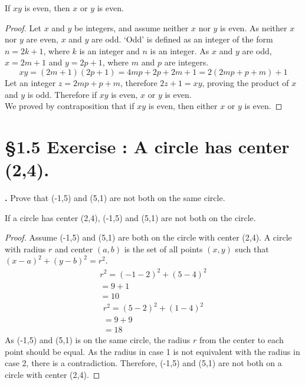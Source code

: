 \documentclass[a4paper,11pt]{article}
\begin{document}
\begin{theorem6}
If \(xy\) is even, then \(x\) or \(y\) is even.
\begin{proof}
Let \(x\) and \(y\) be integers, and assume neither \(x\) nor \(y\) is even.
As neither \(x\) nor \(y\) are even, \(x\) and \(y\) are odd.
`Odd' is defined as an integer of the form \(n = 2k+1\), where \(k\) is an 
integer and \(n\) is an integer.
As \(x\) and \(y\) are odd, \(x=2m+1\) and \(y=2p+1\), where \(m\) and \(p\) are 
integers.
\begin{equation*}
xy=(2m+1)(2p+1)=4mp+2p+2m+1=2{(2mp+p+m)}+1
\end{equation*}
Let an integer \(z=2mp+p+m\), therefore \(2z+1=xy\), proving the product of 
\(x\) and \(y\) is odd. Therefore if \(xy\) is even, \(x\) or \(y\) is even.\\
We proved by contraposition that if \(xy\) is even, then either \(x\) or \(y\) 
is even.
\end{proof}
\end{theorem6}

\newpage
\setcounter{ProblemCounter}{5}
\section*{\S 1.5 Exercise : A circle has center {(2,4)}.}
\setcounter{SubsectionCounter}{1}
\noindent\textbf{.}
Prove that {(-1,5)} and {(5,1)} are not both on the same circle.
\begin{theorem6}
  If a circle has center {(2,4)}, {(-1,5)} and {(5,1)} are not both on the circle.
  \begin{proof}
    Assume {(-1,5)} and {(5,1)} are both on the circle with center {(2,4)}. A circle 
    with radius \(r\) and center \((a,b)\) is the set of all points \((x,y)\) 
    such that \({(x-a)}^2+{(y-b)}^2=r^2\).\\
\noindent{}
\begin{multline*}
\label{Ex5case1}
r^2={(-1-2)}^2+{(5-4)}^2\\
=9+1\\
=10
\end{multline*}
\noindent{}
\begin{multline*}
r^2={(5-2)}^2+{(1-4)}^2\\
=9+9\\
=18
\end{multline*}  
As {(-1,5)} and {(5,1)} is on the same circle, the radius \(r\) from the center to 
each point should be equal. As the radius in case 1 is not equivalent with the radius in case 2, 
there is a contradiction. Therefore, {(-1,5)} and {(5,1)} are not both on a circle 
with center (2,4).
\end{proof}
\end{theorem6}
\newpage
\end{document}
